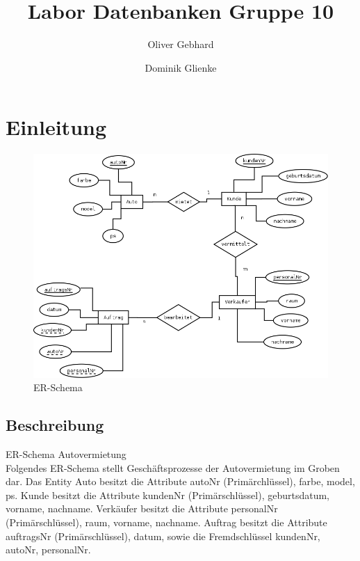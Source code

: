\documentclass[a4paper,12pt]{article}
\begin{document}
\title{Labor Datenbanken Gruppe 10}
\author{ Oliver Gebhard \and Dominik Glienke }
\maketitle

\newpage
\tableofcontents
\newpage
\setcounter{tocdepth}{2}


\section{Einleitung}

\begin{figure}[h]
    \centering
    \includegraphics[scale=0.34]{ER_Schema_Autovermietung.png}
    \caption{ER-Schema}
    \label{Autovermietung}
\end{figure}

\subsection{Beschreibung}

ER-Schema Autovermietung \\

Folgendes ER-Schema stellt Geschäftsprozesse der Autovermietung im Groben dar. 
Das Entity 	Auto besitzt die Attribute autoNr (Primärchlüssel), farbe, model, ps.
		Kunde besitzt die Attribute kundenNr (Primärschlüssel), geburtsdatum, vorname, nachname.
Verkäufer besitzt die Attribute personalNr (Primärschlüssel), raum, vorname, nachname.
Auftrag besitzt die Attribute auftragsNr (Primärschlüssel), datum, sowie die Fremdschlüssel kundenNr, autoNr, personalNr.
\end{document}
